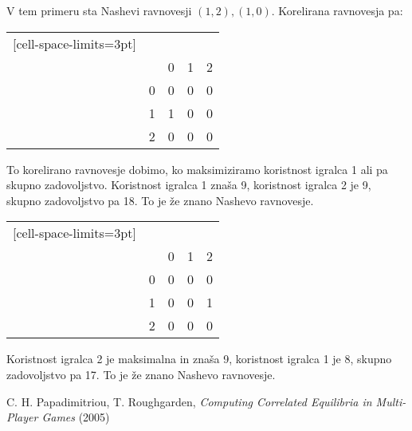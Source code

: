 \documentclass{article}
\begin{document}
V tem primeru sta Nashevi ravnovesji $(1, 2), (1,0)$.
Korelirana ravnovesja pa:

\noindent
\begin{minipage}[t]{0.2\textwidth}
    \begin{NiceTabular}{ccccc}[cell-space-limits=3pt]
        &     &  & \\
        &     & 0     & 1 & 2 \\
        & 0 & 
              0 & 0 & 0\\
        & 1 & 1 & 0 & 0 \\
        & 2 &  0  & 0    & 0 \\
    \end{NiceTabular}
\end{minipage}%
\hfill
\begin{minipage}[t]{0.7\textwidth}
To korelirano ravnovesje dobimo, ko maksimiziramo koristnost igralca 1 ali pa skupno zadovoljstvo. Koristnost igralca 1 znaša 9, koristnost igralca 2 je 9, skupno zadovoljstvo pa 18. To je že znano Nashevo ravnovesje.
\end{minipage}
\vspace{0.5cm} 

\noindent
\begin{minipage}[t]{0.2\textwidth}
    \begin{NiceTabular}{ccccc}[cell-space-limits=3pt]
        &     &  & \\
        &     & 0     & 1 & 2 \\
        & 0 & 
              0 & 0 & 0\\
        & 1 & 0 & 0 & 1 \\
        & 2 &  0  & 0    & 0 \\
    \end{NiceTabular}
\end{minipage}%
\hfill
\begin{minipage}[t]{0.7\textwidth}
Koristnost igralca 2 je maksimalna in znaša 9, koristnost igralca 1 je 8, skupno zadovoljstvo pa 17. To je že znano Nashevo ravnovesje.
\end{minipage}
\vspace{0.5cm}



\begin{thebibliography}{99}

     C. H. Papadimitriou, T. Roughgarden, \emph{Computing Correlated Equilibria in Multi-Player Games} (2005)


\end{thebibliography}
\end{document}

